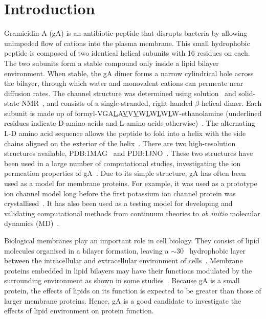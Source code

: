 \section{Introduction}
Gramicidin A (gA) is an antibiotic peptide that disrupts bacteria by allowing unimpeded flow of 
cations into the plasma membrane. This small hydrophobic peptide is composed of two identical 
helical subunits with 16 residues on each. The two subunits form a stable compound only inside a 
lipid bilayer environment. When stable, the gA dimer forms a narrow cylindrical hole across the 
bilayer, through which water and monovalent cations can permeate near diffusion rates. The channel 
structure was determined using solution~\cite{Arseniev1985} and solid-state NMR~\cite{Ketchem1993}, 
and consists of a single-stranded, right-handed $\beta$-helical dimer. Each subunit is made up of 
formyl-VGA\underline{L}A\underline{V}V\underline{V}W\underline{L}W\underline{L}W\underline{L}W-ethanolamine 
(underlined residues indicate D-amino acids and L-amino acids otherwise)~\cite{Sarges1965}. The 
alternating L-D amino acid sequence allows the peptide to fold into a helix with the side chains 
aligned on the exterior of the helix~\cite{RamachandranGNChandrasekaran1972}. There are two 
high-resolution structures available, PDB:1MAG~\cite{Ketchem1996} and PDB:1JNO~\cite{Townsley2001}. 
These two structures have been used in a large number of computational studies, investigating the 
ion permeation properties of gA~\cite{Allen2003,Allen2004,Allen2006,Bastug2006c}. Due to its simple 
structure, gA has often been used as a model for membrane proteins. For example, it was used as a 
prototype ion channel model long before the first potassium ion channel protein was 
crystallised~\cite{RouxBenoitandKarplus1994,Partenskii1992}. It has also been used as a testing 
model for developing and validating computational methods from continuum theories to 
\textit{ab initio} molecular dynamics (MD)~\cite{Edwards2002,Allen2003,Bastug2006a,Bastug2007a,
Timko2012}.

Biological membranes play an important role in cell biology. They consist of lipid molecules
organised in a bilayer formation, leaving a $\sim$30 \angs\ hydrophobic layer between the 
intracellular and extracellular environment of cells~\cite{VanMeer2008a}. Membrane proteins 
embedded in lipid bilayers may have their functions modulated by the surrounding environment as 
shown in some studies~\cite{Lee2005a,JensenMortenandMouritsen2004,Elmore2003a,Valiyaveetil2002}. 
Because gA is a small protein, the effects of lipids on its function is expected to be greater 
than those of larger membrane proteins. Hence, gA is a good candidate to investigate the effects 
of lipid environment on protein function.

